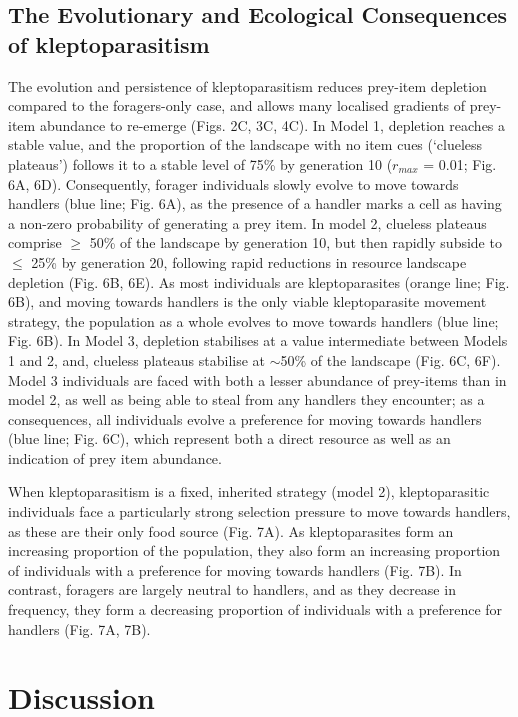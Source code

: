 \documentclass[11pt]{article}
\begin{document}
\subsection{The Evolutionary and Ecological Consequences of kleptoparasitism}

The evolution and persistence of kleptoparasitism reduces prey-item depletion compared to the foragers-only case, and allows many localised gradients of prey-item abundance to re-emerge (Figs. 2C, 3C, 4C).
In Model 1, depletion reaches a stable value, and the proportion of the landscape with no item cues (`clueless plateaus') follows it to a stable level of 75\% by generation 10 ($r_{max}$ = 0.01; Fig. 6A, 6D).
Consequently, forager individuals slowly evolve to move towards handlers (blue line; Fig. 6A), as the presence of a handler marks a cell as having a non-zero probability of generating a prey item.
%
In model 2, clueless plateaus comprise $\geq$ 50\% of the landscape by generation 10, but then rapidly subside to $\leq$ 25\% by generation 20, following rapid reductions in resource landscape depletion (Fig. 6B, 6E).
As most individuals are kleptoparasites (orange line; Fig. 6B), and moving towards handlers is the only viable kleptoparasite movement strategy, the population as a whole evolves to move towards handlers (blue line; Fig. 6B).
In Model 3, depletion stabilises at a value intermediate between Models 1 and 2, and, clueless plateaus stabilise at $\sim$50\% of the landscape (Fig. 6C, 6F).
Model 3 individuals are faced with both a lesser abundance of prey-items than in model 2, as well as being able to steal from any handlers they encounter; as a consequences, all individuals evolve a preference for moving towards handlers (blue line; Fig. 6C), which represent both a direct resource as well as an indication of prey item abundance.

When kleptoparasitism is a fixed, inherited strategy (model 2), kleptoparasitic individuals face a particularly strong selection pressure to move towards handlers, as these are their only food source (Fig. 7A).
As kleptoparasites form an increasing proportion of the population, they also form an increasing proportion of individuals with a preference for moving towards handlers (Fig. 7B).
In contrast, foragers are largely neutral to handlers, and as they decrease in frequency, they form a decreasing proportion of individuals with a preference for handlers (Fig. 7A, 7B).

\section{Discussion}
\end{document}
